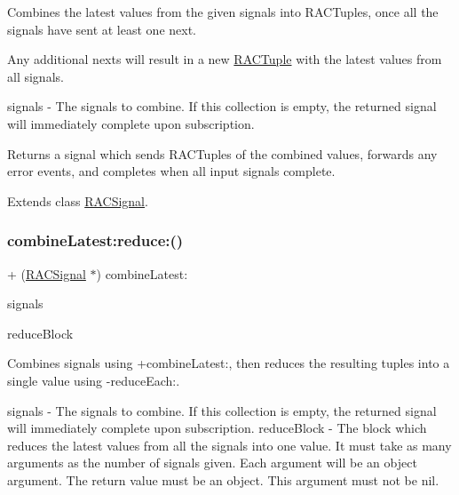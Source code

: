 Combines the latest values from the given signals into R\+A\+C\+Tuples, once all the signals have sent at least one {\ttfamily next}.

Any additional {\ttfamily next}s will result in a new \mbox{\hyperlink{interface_r_a_c_tuple}{R\+A\+C\+Tuple}} with the latest values from all signals.

signals -\/ The signals to combine. If this collection is empty, the returned signal will immediately complete upon subscription.

Returns a signal which sends R\+A\+C\+Tuples of the combined values, forwards any {\ttfamily error} events, and completes when all input signals complete. 

Extends class \mbox{\hyperlink{interface_r_a_c_signal_a8a7a563a48665fb1203e2b37db6e5e98}{R\+A\+C\+Signal}}.

\mbox{\label{category_r_a_c_signal_07_operations_08_a5e4d2db914a14c415646d9fdda131221}} 
\subsubsection{\texorpdfstring{combine\+Latest\+:reduce\+:()}{combineLatest:reduce:()}\hspace{0.1cm}{\footnotesize\ttfamily [1/3]}}
{\footnotesize\ttfamily + (\mbox{\hyperlink{interface_r_a_c_signal}{R\+A\+C\+Signal}} $\ast$) combine\+Latest\+: \begin{DoxyParamCaption}\item[{(id$<$ N\+S\+Fast\+Enumeration $>$)}]{signals }\item[{reduce:(id($^\wedge$)())}]{reduce\+Block }\end{DoxyParamCaption}}

Combines signals using +combine\+Latest\+:, then reduces the resulting tuples into a single value using -\/reduce\+Each\+:.

signals -\/ The signals to combine. If this collection is empty, the returned signal will immediately complete upon subscription. reduce\+Block -\/ The block which reduces the latest values from all the signals into one value. It must take as many arguments as the number of signals given. Each argument will be an object argument. The return value must be an object. This argument must not be nil.

